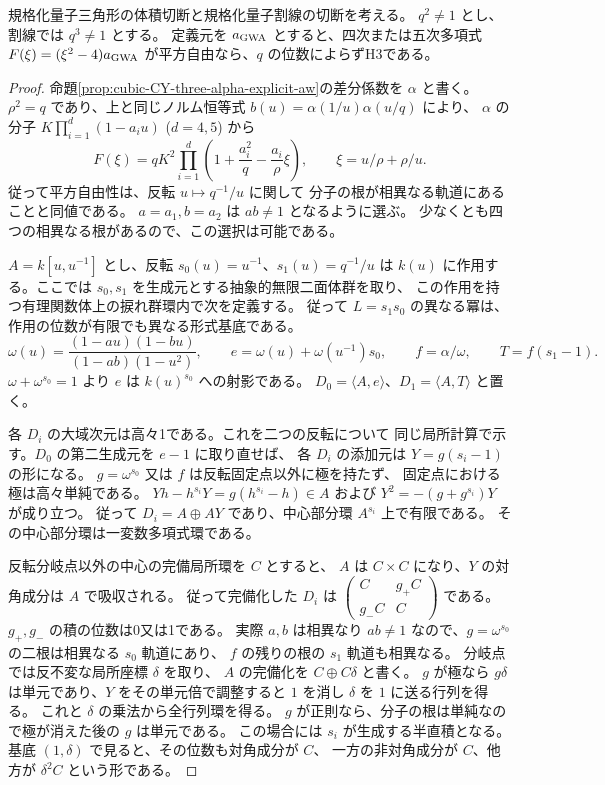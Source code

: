 \begin{theorem}\label{thm:cubic-CY-three-alpha-secant-squarefree}
規格化量子三角形の体積切断と規格化量子割線の切断を考える。
$q^2\ne1$ とし、割線では $q^3\ne1$ とする。
定義元を $a_{\rm GWA}$ とすると、四次または五次多項式
$F(\xi)=(\xi^2-4)a_{\rm GWA}$ が平方自由なら、$q$ の位数によらずH3である。
\end{theorem}
\begin{proof}
命題\ref{prop:cubic-CY-three-alpha-explicit-aw}の差分係数を $\alpha$ と書く。
$\rho^2=q$ であり、上と同じノルム恒等式
$b(u)=\alpha(1/u)\alpha(u/q)$ により、
$\alpha$ の分子 $K\prod_{i=1}^{d}(1-a_i u)$ ($d=4,5$) から
\[
 F(\xi)=qK^2\prod_{i=1}^{d}
 \left(1+\frac{a_i^2}{q}-\frac{a_i}{\rho}\xi\right),
 \qquad \xi=u/\rho+\rho/u.
\]
従って平方自由性は、反転 $u\mapsto q^{-1}/u$ に関して
分子の根が相異なる軌道にあることと同値である。
$a=a_1,b=a_2$ は $ab\ne1$ となるように選ぶ。
少なくとも四つの相異なる根があるので、この選択は可能である。

$A=k[u,u^{-1}]$ とし、反転 $s_0(u)=u^{-1}$、$s_1(u)=q^{-1}/u$ は
$k(u)$ に作用する。ここでは $s_0,s_1$ を生成元とする抽象的無限二面体群を取り、
この作用を持つ有理関数体上の捩れ群環内で次を定義する。
従って $L=s_1s_0$ の異なる冪は、作用の位数が有限でも異なる形式基底である。
\[
 \omega(u)=\frac{(1-au)(1-bu)}{(1-ab)(1-u^2)},\qquad
 e=\omega(u)+\omega(u^{-1})s_0,\qquad
 f=\alpha/\omega,\qquad T=f(s_1-1).
\]
$\omega+\omega^{s_0}=1$ より $e$ は $k(u)^{s_0}$ への射影である。
$D_0=\langle A,e\rangle$、$D_1=\langle A,T\rangle$ と置く。

各 $D_i$ の大域次元は高々1である。これを二つの反転について
同じ局所計算で示す。$D_0$ の第二生成元を $e-1$ に取り直せば、
各 $D_i$ の添加元は $Y=g(s_i-1)$ の形になる。
$g=\omega^{s_0}$ 又は $f$ は反転固定点以外に極を持たず、
固定点における極は高々単純である。
$Yh-h^{s_i}Y=g(h^{s_i}-h)\in A$ および
$Y^2=-(g+g^{s_i})Y$ が成り立つ。
従って $D_i=A\oplus AY$ であり、中心部分環 $A^{s_i}$ 上で有限である。
その中心部分環は一変数多項式環である。

反転分岐点以外の中心の完備局所環を $C$ とすると、
$A$ は $C\times C$ になり、$Y$ の対角成分は $A$ で吸収される。
従って完備化した $D_i$ は
$\left(\begin{smallmatrix}C&g_+ C\\g_- C&C\end{smallmatrix}\right)$
である。$g_+,g_-$ の積の位数は0又は1である。
実際 $a,b$ は相異なり $ab\ne1$ なので、$g=\omega^{s_0}$ の二根は相異なる
$s_0$ 軌道にあり、 $f$ の残りの根の $s_1$ 軌道も相異なる。
分岐点では反不変な局所座標 $\delta$ を取り、
$A$ の完備化を $C\oplus C\delta$ と書く。
$g$ が極なら $g\delta$ は単元であり、$Y$ をその単元倍で調整すると
$1$ を消し $\delta$ を $1$ に送る行列を得る。
これと $\delta$ の乗法から全行列環を得る。
$g$ が正則なら、分子の根は単純なので極が消えた後の $g$ は単元である。
この場合には $s_i$ が生成する半直積となる。
基底 $(1,\delta)$ で見ると、その位数も対角成分が $C$、
一方の非対角成分が $C$、他方が $\delta^2 C$ という形である。


\end{proof}
